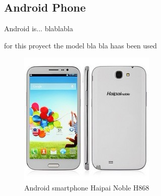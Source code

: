 






\newpage
\subsection{Android Phone}

Android is... blablabla


for this proyect the model bla bla haas been used

	\begin{figure}[H]
			\centering
			\includegraphics[scale=0.8]{images/ProjectComponents/android.jpg}
			\caption{Android smartphone Haipai Noble H868}
			\label{}
	\end{figure}
	\bigskip

